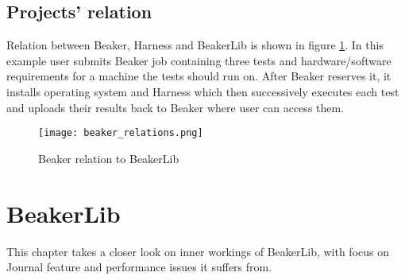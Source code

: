 \section{Projects' relation}
Relation between Beaker, Harness and BeakerLib is shown in figure \ref{fig:beaker_relation}. In this example user submits Beaker job containing three tests and hardware/software requirements for a machine the tests should run on. After Beaker reserves it, it installs operating system and Harness which then successively executes each test and uploads their results back to Beaker where user can access them.

\begin{figure}
  \texttt{[image: beaker\_relations.png]}
  \caption{Beaker relation to BeakerLib}
  \label{fig:beaker_relation}
\end{figure}

\chapter{BeakerLib}
\label{beakerlib_chapter}

This chapter takes a closer look on inner workings of BeakerLib, with focus on Journal feature and performance issues it suffers from. 

